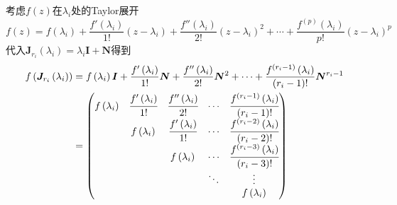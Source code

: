 考虑$f\left(z\right)$在$\lambda_i$处的Taylor展开\[
    f\left(z\right)=f\left(\lambda_i\right)+\frac{f'\left(\lambda_i\right)}{1!}\left(z-\lambda_i\right)+\frac{f''\left(\lambda_i\right)}{2!}\left(z-\lambda_i\right)^2+\cdots+\frac{
        f^{\left(p\right)}\left(\lambda_i\right)
    }{p!}\left(z-\lambda_i\right)^p
\]代入$\bm{J}_{r_i}\left(\lambda_i\right)=\lambda_i\bm{I}+\bm{N}$得到\begin{align*}
    f\left(
    \bm{J}_{r_i}\left(
        \lambda_i
        \right)
    \right) & =f\left(\lambda_i\right)\bm{I}+\frac{f'\left(\lambda_i\right)}{1!}\bm{N}+\frac{f''\left(\lambda_i\right)}{2!}\bm{N}^2+\cdots+\frac{
        f^{\left(r_i-1\right)}\left(\lambda_i\right)
    }{\left(r_i-1\right)!}\bm{N}^{r_i-1}                                                                                                                                                                              \\
            & =\begin{pmatrix}
                   f\left(\lambda_i\right) & \cfrac{f'\left(\lambda_i\right)}{1!} & \cfrac{f''\left(\lambda_i\right)}{2!} & \cdots & \cfrac{f^{\left(r_i-1\right)}\left(\lambda_i\right)}{\left(r_i-1\right)!} \\
                                           & f\left(\lambda_i\right)              & \cfrac{f'\left(\lambda_i\right)}{1!}  & \cdots & \cfrac{f^{\left(r_i-2\right)}\left(\lambda_i\right)}{\left(r_i-2\right)!} \\
                                           &                                      & f\left(\lambda_i\right)               & \cdots & \cfrac{f^{\left(r_i-3\right)}\left(\lambda_i\right)}{\left(r_i-3\right)!} \\
                                           &                                      &                                       & \ddots & \vdots                                                                    \\
                                           &                                      &                                       &        & f\left(\lambda_i\right)
               \end{pmatrix}
\end{align*}
